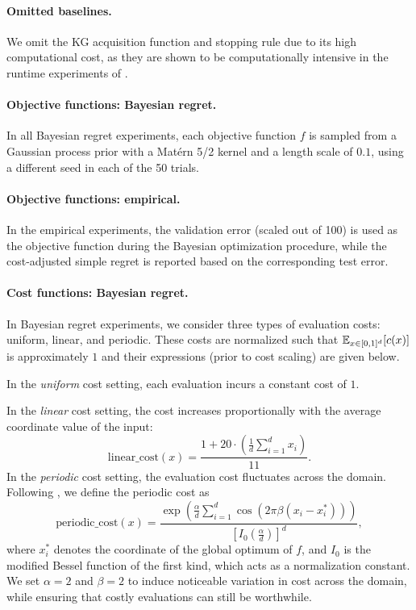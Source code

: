 \paragraph{Omitted baselines.} We omit the KG acquisition function and stopping rule due to its high computational cost, as they are shown to be computationally intensive in the runtime experiments of \citet{xie2024cost}.

\paragraph{Objective functions: Bayesian regret.}
In all Bayesian regret experiments, each objective function $f$ is sampled from a Gaussian process prior with a Matérn 5/2 kernel and a length scale of $0.1$, using a different seed in each of the 50 trials.

\paragraph*{Objective functions: empirical.} 
In the empirical experiments, the validation error (scaled out of 100) is used as the objective function during the Bayesian optimization procedure, while the cost-adjusted simple regret is reported based on the corresponding test error.

\paragraph*{Cost functions: Bayesian regret.}  
In Bayesian regret experiments, we consider three types of evaluation costs: uniform, linear, and periodic. These costs are normalized such that $\mathbb{E}_{x \in [0,1]^d}[c(x)]$ is approximately $1$ and their expressions (prior to cost scaling) are given below.

In the \textit{uniform} cost setting, each evaluation incurs a constant cost of $1$.

In the \textit{linear} cost setting, the cost increases proportionally with the average coordinate value of the input:
\[
\text{linear\_cost}(x) = \frac{1 + 20 \cdot \left( \frac{1}{d} \sum_{i=1}^{d} x_i \right)}{11}.
\]
In the \textit{periodic} cost setting, the evaluation cost fluctuates across the domain. Following \cite{astudillo2021multi}, we define the periodic cost as
\[
\text{periodic\_cost}(x) = \frac{ \exp\left( \frac{\alpha}{d} \sum_{i=1}^{d} \cos\left( 2\pi \beta (x_i - x^*_i) \right) \right) }{ \left[ I_0\left( \frac{\alpha}{d} \right) \right]^d },
\]
where $x^*_i$ denotes the coordinate of the global optimum of $f$, and $I_0$ is the modified Bessel function of the first kind, which acts as a normalization constant. We set $\alpha = 2$ and $\beta = 2$ to induce noticeable variation in cost across the domain, while ensuring that costly evaluations can still be worthwhile. 

